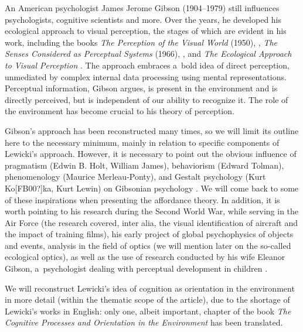\documentclass[%
manuscript=article,
year=2024,
volume=77,
doi=00000.000,
]{zfn}
\begin{document}
An American psychologist James Jerome Gibson (1904–1979) still influences psychologists, cognitive scientists and more. Over the years, he developed his ecological approach to visual perception, the stages of which are evident in his work, including the books \textit{The Perception of the Visual World}
(1950),
\parencite*[][]{gibson_perception_1950},
\textit{The Senses Considered as Perceptual Systems}
(1966),
\parencite*[][]{gibson_senses_1966},
and \textit{The Ecological Approach to Visual Perception} 
\parencite*[][]{gibson_ecological_1979}. %
 The approach embraces a~bold idea of direct perception, unmediated by complex internal data processing using mental representations. Perceptual information, Gibson argues, is present in the environment and is directly perceived, but is independent of our ability to recognize it. The role of the environment has become crucial to his theory of perception.



Gibson's approach has been reconstructed many times, so we will limit its outline here to the necessary minimum, mainly in relation to specific components of Lewicki's approach. However, it is necessary to point out the obvious influence of pragmatism (Edwin B. Holt, William James), behaviorism (Edward Tolman), phenomenology (Maurice Merleau-Ponty), and Gestalt psychology (Kurt Ko[FB00?]ka, Kurt Lewin) on Gibsonian psychology 
\parencite[see][]{lobo_history_2018}. %
 We will come back to some of these inspirations when presenting the affordance theory. In addition, it is worth pointing to his research during the Second World War, while serving in the Air Force (the research covered, inter alia, the visual identification of aircraft and the impact of training films), his early project of global psychophysics of objects and events, analysis in the field of optics (we will mention later on the so-called ecological optics), as well as the use of research conducted by his wife Eleanor Gibson, a~psychologist dealing with perceptual development in children 
\parencites[][]{gibson_principles_1969}[][]{hochberg_james_1994}[][]{heft_ecological_2001}[][]{lobo_history_2018}.%




We will reconstruct Lewicki's idea of cognition as orientation in the environment in more detail (within the thematic scope of the article), due to the shortage of Lewicki's works in English: only one, albeit important, chapter of the book \textit{The Cognitive Processes and Orientation in the Environment} 
\parencite*[][]{lewicki_cognition_2016} %
 has been translated.
\end{document}
